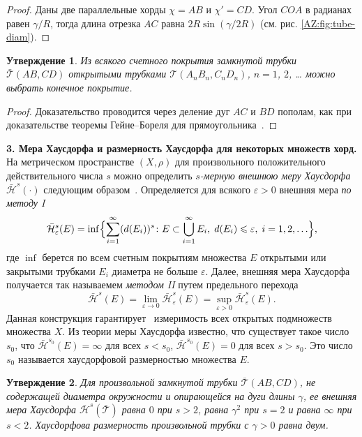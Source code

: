 \documentclass[12pt]{article}
\newtheorem{prep}{Утверждение}
\begin{document}
\begin{proof}
  Даны две параллельные хорды $\chi=AB$ и $\chi'=CD$. Угол $COA$ в радианах
  равен $\gamma/R$, тогда длина отрезка $AC$ равна $2R\sin(\gamma/2R)$
  (см. рис. \ref{AZ:fig:tube-diam}).
\end{proof}


\begin{prep}
  \label{AZ:prep:compact}
  Из всякого счетного покрытия замкнутой трубки $\bar{\mathcal T}(AB, CD)$
  открытыми трубками ${\mathcal T}(A_nB_n, C_nD_n)$, $n=1$, $2$, \ldots{} можно
  выбрать конечное покрытие.
\end{prep}

\begin{proof}
  Доказательство проводится через деление дуг $AC$ и $BD$ пополам, как при
  доказательстве теоремы Гейне--Бореля для прямоугольника~\cite{Zorich}.
\end{proof}

\bigskip

\textbf{3. Мера Хаусдорфа и размерность Хаусдорфа для некоторых множеств хорд.}
На метрическом пространстве $(X, \rho)$ для произвольного положительного
действительного числа $s$ можно определить \emph{$s$-мерную внешнюю меру
  Хаусдорфа} $\bar{\mathcal H}^s(\cdot)$ следующим
образом~\cite{Edgar}. Определяется для всякого $\varepsilon>0$ внешняя мера
\emph{по методу I}
$$
\bar{\mathcal H}^s_\varepsilon (E)= \inf\Bigl\{ \sum_{i=1}^\infty (d(E_i))^s\colon
E\subset \bigcup_{i=1}^\infty E_i, \; d(E_i)\leqslant \varepsilon,\; i=1, 2,
\ldots \Bigr\},
$$
где $\inf$ берется по всем счетным покрытиям множества $E$ открытыми или
закрытыми трубками $E_i$ диаметра не больше $\varepsilon$. Далее, внешняя мера
Хаусдорфа получается так называемем \emph{методом II} путем предельного перехода
$$
\bar{\mathcal H}^s(E) = \lim_{\varepsilon\to0} \bar{\mathcal
  H}^s_\varepsilon(E)=\sup_{\varepsilon>0} \bar{\mathcal
  H}^s_\varepsilon(E) .
$$
Данная конструкция гарантирует~\cite{Edgar} измеримость всех открытых подмножеств множества
$X$. Из теории меры Хаусдорфа известно, что существует такое число $s_0$, что
$\bar{\mathcal H}^{s_0}(E)=\infty$ для всех $s<s_0$, $\bar{\mathcal H}^{s_0}(E)=0$ для всех
$s>s_0$. Это число $s_0$ называется хаусдорфовой размерностью множества $E$.

\begin{prep}
  \label{AZ:prep:tube}
  Для произвольной замкнутой трубки $\bar{\mathcal T}(AB,CD)$, не содержащей
  диаметра окружности и опирающейся на дуги длины $\gamma$, ее внешняя мера
  Хаусдорфа $\bar{\mathcal H}^s(\bar{\mathcal T})$ равна $0$ при $s>2$, равна
  $\gamma^2$ при $s=2$ и равна $\infty$ при $s<2$. Хаусдорфова размерность
  произвольной трубки с $\gamma>0$ равна двум.
\end{prep}
\medskip
\end{document}
